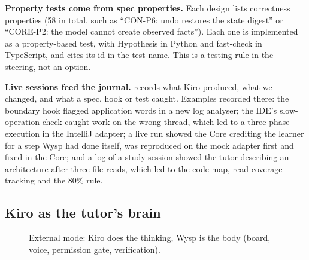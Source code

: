 \textbf{Property tests come from spec properties.} Each design lists correctness properties (58 in total, such as ``CON-P6: undo restores the state digest'' or ``CORE-P2: the model cannot create observed facts''). Each one is implemented as a property-based test, with Hypothesis in Python and fast-check in TypeScript, and cites its id in the test name. This is a testing rule in the steering, not an option.

\textbf{Live sessions feed the journal.}  records what Kiro produced, what we changed, and what a spec, hook or test caught. Examples recorded there: the boundary hook flagged application words in a new log analyser; the IDE's slow-operation check caught work on the wrong thread, which led to a three-phase execution in the IntelliJ adapter; a live run showed the Core crediting the learner for a step Wysp had done itself, was reproduced on the mock adapter first and fixed in the Core; and a log of a study session showed the tutor describing an architecture after three file reads, which led to the code map, read-coverage tracking and the 80\% rule.

\subsection{Kiro as the tutor's brain}

\begin{figure}[H]
\centering
{}
\caption{External mode: Kiro does the thinking, Wysp is the body (board, voice, permission gate, verification).}\label{fig:kiro-brain}
\end{figure}

